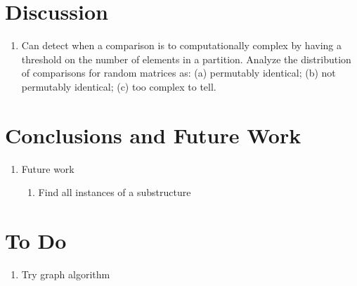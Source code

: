 \documentclass{article}
\begin{document}
\section{Discussion}
\begin{enumerate}
    \item Can detect when a comparison is to computationally complex by having a threshold on the number of elements in a partition. Analyze the distribution of comparisons for random matrices as: (a) permutably identical; (b) not permutably identical; (c) too complex to tell.
\end{enumerate}

\section{Conclusions and Future Work}
\begin{enumerate}
    \item Future work
    \begin{enumerate}
        \item Find all instances of a substructure
    \end{enumerate}
\end{enumerate}




\section{To Do}
\begin{enumerate}
    \item Try graph algorithm
\end{enumerate}
\end{document}

